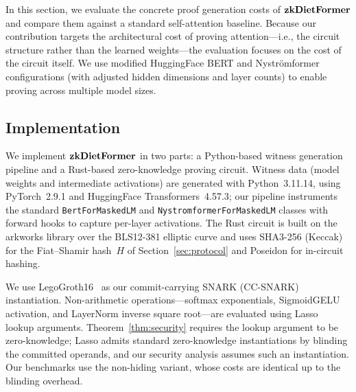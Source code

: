 \documentclass[sigconf,anonymous,review,balance=false]{acmart}
\newcommand{\rev}[1]{{\color{magenta}#1}}
\begin{document}
In this section, we evaluate the concrete proof generation costs of ${\bf zkDietFormer}$ and compare them against a standard self-attention baseline. Because our contribution targets the architectural cost of proving attention—i.e., the circuit structure rather than the learned weights—the evaluation focuses on the cost of the circuit itself. We use modified HuggingFace BERT and Nyströmformer configurations (with adjusted hidden dimensions and layer counts) to enable proving across multiple model sizes. 

\subsection{Implementation}
We implement ${\bf zkDietFormer}$ in two parts: a Python-based witness generation pipeline and a Rust-based zero-knowledge proving circuit. Witness data (model weights and intermediate activations) are generated \rev{with Python~3.11.14, using PyTorch~2.9.1 and HuggingFace Transformers~4.57.3; our pipeline instruments} the standard \texttt{BertForMaskedLM} and \texttt{NystromformerForMaskedLM} \rev{classes} with forward hooks to capture per-layer activations. The Rust circuit is built on the arkworks library over the BLS12-381 elliptic curve and \rev{uses SHA3-256 (Keccak) for the Fiat--Shamir hash~$H$ of Section~\ref{sec:protocol} and Poseidon for in-circuit hashing}. %

We use LegoGroth16~\cite{Legosnark} as our commit-carrying SNARK (CC-SNARK) instantiation.  Non-arithmetic operations—softmax exponentials, SigmoidGELU activation, and LayerNorm inverse square root—are evaluated using Lasso~\cite{Lasso} lookup arguments. \rev{Theorem~\ref{thm:security} requires the lookup argument to be zero-knowledge; Lasso admits standard zero-knowledge instantiations by blinding the committed operands, and our security analysis assumes such an instantiation. Our benchmarks use the non-hiding variant, whose costs are identical up to the blinding overhead.}

\end{document}
